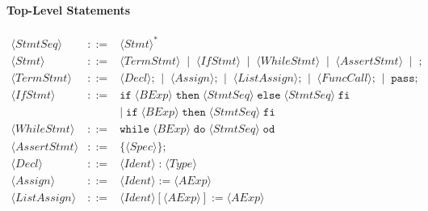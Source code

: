 \documentclass{article}
\begin{document}
\paragraph{Top-Level Statements}
\[
\begin{array}{rcl}
\langle \mathit{StmtSeq} \rangle
&::=&
\langle \mathit{Stmt} \rangle^* \\[4pt]

\langle \mathit{Stmt} \rangle
&::=&
\langle \mathit{TermStmt} \rangle
\;\mid\;
\langle \mathit{IfStmt} \rangle
\;\mid\;
\langle \mathit{WhileStmt} \rangle
\;\mid\;
\langle \mathit{AssertStmt} \rangle
\;\mid\;
\texttt{;} \\[4pt]

\langle \mathit{TermStmt} \rangle
&::=&
\langle \mathit{Decl} \rangle\texttt{;}
\;\mid\;
\langle \mathit{Assign} \rangle\texttt{;}
\;\mid\;
\langle \mathit{ListAssign} \rangle\texttt{;}
\;\mid\;
\langle \mathit{FuncCall} \rangle\texttt{;}
\;\mid\;
\mathtt{pass}\texttt{;} \\[4pt]

\langle \mathit{IfStmt} \rangle
&::=&
\mathtt{if}\;\langle \mathit{BExp} \rangle\;\mathtt{then}\;\langle \mathit{StmtSeq} \rangle\;\mathtt{else}\;\langle \mathit{StmtSeq} \rangle\;\mathtt{fi} \\
&& \mid\;
\mathtt{if}\;\langle \mathit{BExp} \rangle\;\mathtt{then}\;\langle \mathit{StmtSeq} \rangle\;\mathtt{fi} \\[4pt]

\langle \mathit{WhileStmt} \rangle
&::=&
\mathtt{while}\;\langle \mathit{BExp} \rangle\;\mathtt{do}\;\langle \mathit{StmtSeq} \rangle\;\mathtt{od} \\[4pt]

\langle \mathit{AssertStmt} \rangle
&::=&
\{\langle \mathit{Spec} \rangle\}\texttt{;} \\[4pt]

\langle \mathit{Decl} \rangle
&::=&
\langle \mathit{Ident} \rangle\;\texttt{:}\;\langle \mathit{Type} \rangle \\[4pt]

\langle \mathit{Assign} \rangle
&::=&
\langle \mathit{Ident} \rangle\;\texttt{:=}\;\langle \mathit{AExp} \rangle \\[4pt]

\langle \mathit{ListAssign} \rangle
&::=&
\langle \mathit{Ident} \rangle[\langle \mathit{AExp} \rangle]\;\texttt{:=}\;\langle \mathit{AExp} \rangle
\end{array}
\]
\end{document}
